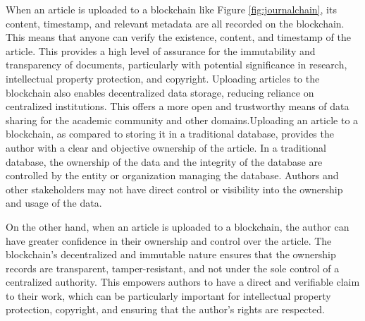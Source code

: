 \documentclass[lettersize,journal]{IEEEtran}
\begin{document}
When an article is uploaded to a blockchain like Figure \ref{fig:journalchain}, its content, timestamp, and relevant metadata are all recorded on the blockchain. This means that anyone can verify the existence, content, and timestamp of the article. This provides a high level of assurance for the immutability and transparency of documents, particularly with potential significance in research, intellectual property protection, and copyright. Uploading articles to the blockchain also enables decentralized data storage, reducing reliance on centralized institutions. This offers a more open and trustworthy means of data sharing for the academic community and other domains.Uploading an article to a blockchain, as compared to storing it in a traditional database, provides the author with a clear and objective ownership of the article. In a traditional database, the ownership of the data and the integrity of the database are controlled by the entity or organization managing the database. Authors and other stakeholders may not have direct control or visibility into the ownership and usage of the data.

On the other hand, when an article is uploaded to a blockchain, the author can have greater confidence in their ownership and control over the article. The blockchain's decentralized and immutable nature ensures that the ownership records are transparent, tamper-resistant, and not under the sole control of a centralized authority. This empowers authors to have a direct and verifiable claim to their work, which can be particularly important for intellectual property protection, copyright, and ensuring that the author's rights are respected.
\end{document}
